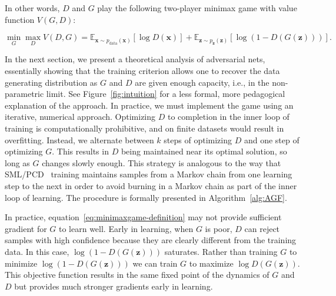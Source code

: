 In other words, $D$ and $G$ play the following two-player minimax game with value function $V(G, D)$: 

\begin{equation}
\label{eq:minimaxgame-definition}
\min_G \max_D V(D, G) = \mathbb{E}_{\bm{x} \sim p_{\text{data}}(\bm{x})}[\log D(\bm{x})] + \mathbb{E}_{\bm{z} \sim p_{\bm{z}}(\bm{z})}[\log (1 - D(G(\bm{z})))].
\end{equation}

In the next section, we present a theoretical analysis of adversarial nets,
essentially showing that the training criterion allows one to recover the data
generating distribution as $G$ and $D$ are given enough capacity, i.e., in the
non-parametric limit. See Figure~\ref{fig:intuition} for a less formal, more pedagogical
explanation of the approach.
In practice, we must implement the game using an iterative, numerical approach. Optimizing $D$ to completion in the
inner loop of training is computationally prohibitive,
and on finite datasets would result in overfitting. Instead, we alternate between $k$ steps
of optimizing $D$ and one step of optimizing $G$. This results in $D$ being maintained
near its optimal solution, so long as $G$ changes slowly enough. This strategy is analogous
to the way that SML/PCD~\citep{Younes1999,Tieleman08} training maintains samples from a Markov chain from one
learning step to the next in order to avoid burning in a Markov chain as part of the inner loop
of learning. The procedure is formally presented
in Algorithm~\ref{alg:AGF}.

In practice, equation~\ref{eq:minimaxgame-definition} may not provide sufficient gradient for $G$ to learn
well. Early in learning, when $G$ is poor, $D$ can reject samples with high confidence because they are
clearly different from the training data. In this case, $\log ( 1- D(G(\bm{z})))$ saturates. Rather than
training $G$ to minimize $\log (1 - D(G(\bm{z})))$ we can train $G$ to maximize $\log D(G(\bm{z}))$.
This objective function results in the same fixed point of the dynamics of $G$ and $D$ but provides much
stronger gradients early in learning.



